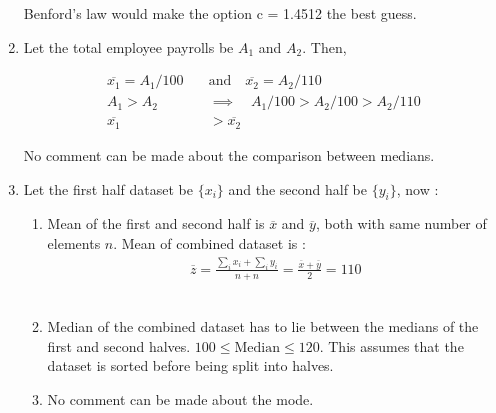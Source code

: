 \begin{enumerate}
	Benford's law would make the option c = 1.4512 the best guess. \\
	
	\item Let the total employee payrolls be $ A_1 $ and $ A_2 $. Then, 
	
		\begin{align}
			\overline{x_1} = A_1 / 100 \quad &\text{and} \quad \overline{x_2} = A_2 / 110 \\
			A_1 > A_2 \quad &\implies \quad A_1 / 100 > A_2 / 100 > A_2 / 110 \\
			\overline{x_1} &> \overline{x_2} 
		\end{align}
	
	
	No comment can be made about the comparison between medians. \\
	
	\item Let the first half dataset be $ \{x_i\} $ and the second half be $ \{y_i\} $, now : 
	\begin{enumerate}
		\item Mean of the first and second half is $\overline{x}$ and $ \overline{y} $, both with same number of elements $ n $. Mean of combined dataset is : 
		\begin{align}
			\overline{z} = \frac{\sum_{i} x_i + \sum_{i} y_i}{n + n} = \frac{\overline{x} + \overline{y}}{2} = 110
		\end{align} \\
		
		\item Median of the combined dataset has to lie between the medians of the first and second halves. $ 100 \leq \text{Median}  \leq 120 $. This assumes that the dataset is sorted before being split into halves. \\
		
		\item No comment can be made about the mode.
	\end{enumerate}
	

\end{enumerate}
